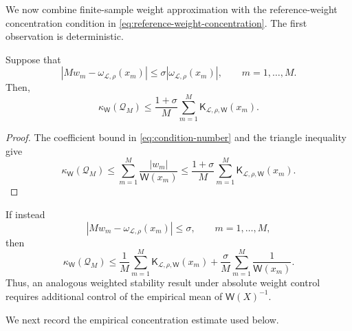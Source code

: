 \documentclass[10pt,dvipsnames]{amsart}
\begin{document}
We now combine finite-sample weight approximation with the
reference-weight concentration condition in
\eqref{eq:reference-weight-concentration}. The first observation is
deterministic.

\begin{lemma}
\label{lemma:condition-number-reduction}
Suppose that
\[
    \left|
        Mw_m-\omega_{\mathcal L,\rho}(x_m)
    \right|
    \leq
    \sigma
    \left|
        \omega_{\mathcal L,\rho}(x_m)
    \right|,
    \qquad
    m=1,\ldots,M.
\]
Then,
\[
    \kappa_{\mathsf W}(\mathcal Q_M)
    \leq
    \frac{1+\sigma}{M}
    \sum_{m=1}^M
    \mathsf K_{\mathcal L,\rho,\mathsf W}(x_m).
\]
\end{lemma}

\begin{proof}
The coefficient bound in \eqref{eq:condition-number} and the triangle
inequality give
\[
    \kappa_{\mathsf W}(\mathcal Q_M)
    \leq
    \sum_{m=1}^M \frac{|w_m|}{\mathsf W(x_m)}
    \leq
    \frac{1+\sigma}{M}
    \sum_{m=1}^M
    \mathsf K_{\mathcal L,\rho,\mathsf W}(x_m).
\]
\end{proof}

\begin{remark}
\label{rem:absolute-condition-number-reduction}
If instead
\[
    \left|
        Mw_m-\omega_{\mathcal L,\rho}(x_m)
    \right|
    \leq
    \sigma,
    \qquad
    m=1,\ldots,M,
\]
then
\[
    \kappa_{\mathsf W}(\mathcal Q_M)
    \leq
    \frac1M
    \sum_{m=1}^M
    \mathsf K_{\mathcal L,\rho,\mathsf W}(x_m)
    +
    \frac{\sigma}{M}
    \sum_{m=1}^M
    \frac1{\mathsf W(x_m)}.
\]
Thus, an analogous weighted stability result under absolute weight control
requires additional control of the empirical mean of
\(\mathsf W(X)^{-1}\).
\end{remark}

We next record the empirical concentration estimate used below.
\end{document}
